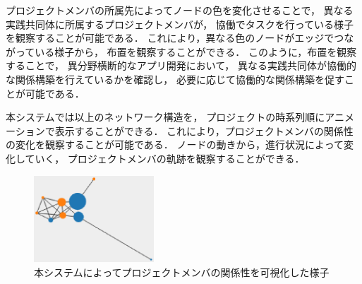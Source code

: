 プロジェクトメンバの所属先によってノードの色を変化させることで，
異なる実践共同体に所属するプロジェクトメンバが，
協働でタスクを行っている様子を観察することが可能である．
これにより，異なる色のノードがエッジでつながっている様子から，
布置を観察することができる．
このように，布置を観察することで，
異分野横断的なアプリ開発において，
異なる実践共同体が協働的な関係構築を行えているかを確認し，
必要に応じて協働的な関係構築を促すことが可能である．

本システムでは以上のネットワーク構造を，
プロジェクトの時系列順にアニメーションで表示することができる．
これにより，プロジェクトメンバの関係性の変化を観察することが可能である．
ノードの動きから，進行状況によって変化していく，
プロジェクトメンバの軌跡を観察することができる．

\begin{figure}[h]
  \centering
  \includegraphics[width=0.4\textwidth]{img/cop-map-graph.eps}
  \caption{本システムによってプロジェクトメンバの関係性を可視化した様子}
  \label{cop-map-graph}
\end{figure}
